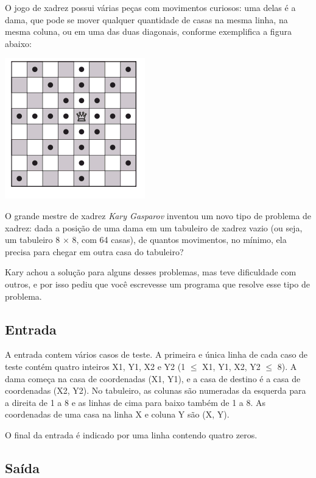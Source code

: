 O jogo de xadrez possui várias peças com movimentos curiosos: uma delas é a
dama, que pode se mover qualquer quantidade de casas na mesma linha, na mesma
coluna, ou em uma das duas diagonais, conforme exemplifica a figura abaixo:

\begin{center}
\includegraphics[scale=0.6]{problems/dama/imagens/dama.png}
\end{center}

O grande mestre de xadrez \textit{Kary Gasparov} inventou um novo tipo de problema de
xadrez: dada a posição de uma dama em um tabuleiro de xadrez vazio (ou seja, um
tabuleiro 8 $\times$ 8, com 64 casas), de quantos movimentos, no mínimo, ela
precisa para chegar em outra casa do tabuleiro?

Kary achou a solução para alguns desses problemas, mas teve dificuldade com
outros, e por isso pediu que você escrevesse um programa que resolve esse tipo
de problema.

\subsection*{Entrada}

A entrada contem vários casos de teste. A primeira e única linha de cada caso de
teste contém quatro inteiros X1, Y1, X2 e Y2 (1 $\leq$ X1, Y1, X2, Y2 $\leq$ 8). A
dama começa na casa de coordenadas (X1, Y1), e a casa de destino é a casa de
coordenadas (X2, Y2). No tabuleiro, as colunas são numeradas da esquerda para a
direita de 1 a 8 e as linhas de cima para baixo também de 1 a 8. As coordenadas
de uma casa na linha X e coluna Y são (X, Y).

O final da entrada é indicado por uma linha contendo quatro zeros.

\subsection*{Saída}

